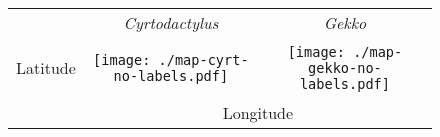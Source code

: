 \documentclass[border=20pt,varwidth=30cm]{standalone}
\newcounter{subfloat}
\renewcommand{\thesubfloat}{\Alph{subfloat}}
\newcommand{\insertlabel}{%
    \small
    \stepcounter{subfloat}%
    \thesubfloat}
\newcommand{\trm}[1]{\ensuremath{\textrm{\sffamily #1}}}
\begin{document}
\begin{figure}
    \centering
    \begin{tabular}{@{}ccc@{}}
        & {\Huge \textsl{Cyrtodactylus}} & {\Huge \textsl{Gekko}} \\
        \multirow{1}{*}[26em]{\begin{rotate}{90}\Huge Latitude\end{rotate}} &
        \texttt{[image: ./map-cyrt-no-labels.pdf]} &
        \texttt{[image: ./map-gekko-no-labels.pdf]} \\
        & \multicolumn{2}{c}{\Huge Longitude}
    \end{tabular}
\end{figure}
\end{document}
